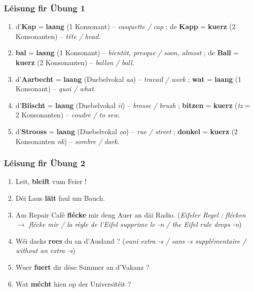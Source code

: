 \subsubsection*{Léisung fir Übung 1}
\begin{enumerate}
    \item d'\textbf{Kap} = \textbf{laang} (1 Konsonant) -- \textit{casquette / cap} ; de \textbf{Kapp} = \textbf{kuerz} (2 Konsonanten) -- \textit{tête / head}.
    \item \textbf{bal} = \textbf{laang} (1 Konsonant) -- \textit{bientôt, presque / soon, almost} ; de \textbf{Ball} = \textbf{kuerz} (2 Konsonanten) -- \textit{ballon / ball}.
    \item d'\textbf{Aarbecht} = \textbf{laang} (Duebelvokal \textit{aa}) -- \textit{travail / work} ; \textbf{wat} = \textbf{laang} (1 Konsonant) -- \textit{quoi / what}.
    \item d'\textbf{Biischt} = \textbf{laang} (Duebelvokal \textit{ii}) -- \textit{brosse / brush} ; \textbf{bitzen} = \textbf{kuerz} (\textit{tz} = 2 Konsonanten) -- \textit{coudre / to sew}.
    \item d'\textbf{Strooss} = \textbf{laang} (Duebelvokal \textit{oo}) -- \textit{rue / street} ; \textbf{donkel} = \textbf{kuerz} (2 Konsonanten \textit{nk}) -- \textit{sombre / dark}.
\end{enumerate}

\subsubsection*{Léisung fir Übung 2}
\begin{enumerate}
    \item Leit, \textbf{bleift} vum Feier !
    \item Déi Laus \textbf{läit} faul um Bauch.
    \item Am Repair Café \textbf{flécke} mir deng Auer an däi Radio. (\textit{Eifeler Regel : flécken $\rightarrow$ flécke mir / la règle de l'Eifel supprime le -n / the Eifel rule drops -n})
    \item Wéi dacks \textbf{rees} du an d'Ausland ? (\textit{ouni extra -s / sans -s supplémentaire / without an extra -s})
    \item Wuer \textbf{fuert} dir dëse Summer an d'Vakanz ?
    \item Wat \textbf{mécht} hien op der Universitéit ?
\end{enumerate}

